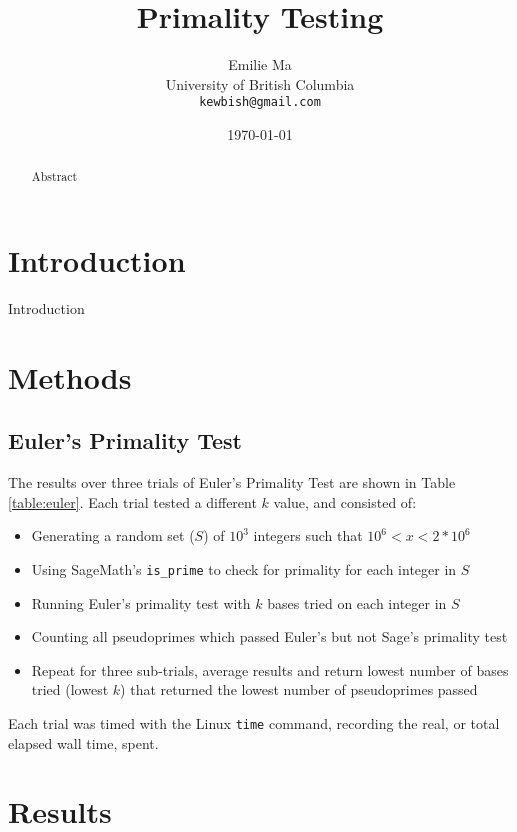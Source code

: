 \documentclass{article}
\title[Primality Testing]{Primality Testing}
\author[Emilie Ma]{%
Emilie Ma\\%
University of British Columbia\\%
\texttt{kewbish@gmail.com}%
}
\date{\today}
\begin{document}
\maketitle
\newpage
\begin{abstract}
    Abstract
\end{abstract}

\section{Introduction}
Introduction

\section{Methods}

\subsection{Euler's Primality Test}
The results over three trials of Euler's Primality Test are shown in Table \ref{table:euler}. Each trial tested a different $k$ value, and consisted of:
\begin{itemize}
    \item{Generating a random set ($S$) of $10^3$ integers such that $10^6 < x < 2*10^6$}
    \item{Using SageMath's \texttt{is\_prime} to check for primality for each integer in $S$}
    \item{Running Euler's primality test with $k$ bases tried on each integer in $S$}
    \item{Counting all pseudoprimes which passed Euler's but not Sage's primality test}
    \item{Repeat for three sub-trials, average results and return lowest number of bases tried (lowest $k$) that returned the lowest number of pseudoprimes passed}
\end{itemize}
Each trial was timed with the Linux \texttt{time} command, recording the real, or total elapsed wall time, spent. 

\section{Results}
\end{document}

